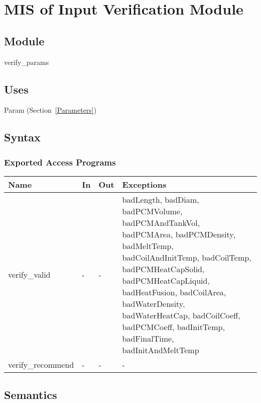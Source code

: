 \documentclass[12pt]{article}
\begin{document}
\newpage
\section{MIS of Input Verification Module} \label{VerifyInput}

\subsection{Module}

verify\_params

\subsection{Uses}

Param (Section~\ref{Parameters})

\subsection{Syntax}

\subsubsection{Exported Access Programs}

\begin{center}
\begin{tabular}{p{3cm} p{1cm} p{1cm} p{9cm}}
\hline
\textbf{Name} & \textbf{In} & \textbf{Out} & \textbf{Exceptions} \\
\hline
verify\_valid & - & - & badLength, badDiam, badPCMVolume, badPCMAndTankVol,
                        badPCMArea, badPCMDensity, badMeltTemp,
                        badCoilAndInitTemp, badCoilTemp, badPCMHeatCapSolid,
                        badPCMHeatCapLiquid, badHeatFusion, badCoilArea,
                        badWaterDensity, badWaterHeatCap, badCoilCoeff,
                        badPCMCoeff, badInitTemp, badFinalTime,
                        badInitAndMeltTemp \\
\hline
verify\_recommend & - & - & - \\
\hline
\end{tabular}
\end{center}

\subsection{Semantics}

\end{document}
